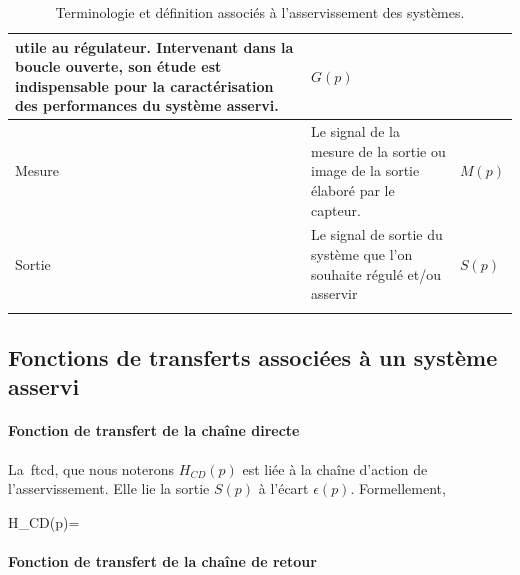 \begin{table}[!h]
\begin{center}
\begin{tabular}{M{3cm}M{8cm}M{4cm}}
                           utile au régulateur. Intervenant dans la boucle ouverte, son étude 
                           est indispensable pour la caractérisation des performances du système asservi.
                                      & $G(p)$                                   \\[0em]
        \hline
        Mesure          & Le signal de la mesure de la sortie ou image de la sortie
                          élaboré par le capteur.
                                      & $M(p)$                                   \\[0em]  
        \hline
        Sortie          & Le signal de sortie du système que l'on souhaite régulé et/ou asservir
                                      & $S(p)$                                   \\[0em]
        \hhline{===}
    \end{tabular}
\end{center}
\caption{Terminologie et définition associés à l'asservissement des systèmes.\label{tab-asser}}
\end{table}

\clearpage

\subsection{Fonctions de transferts associées à un système asservi}


\paragraph{Fonction de transfert de la chaîne directe}

La~\gls{ftcd}, que nous noterons $H_{CD}(p)$ est liée à 
la chaîne d'action de l'asservissement. Elle lie la sortie $S(p)$ à l'écart $\epsilon(p)$.
Formellement,
\begin{bequation}
H_{CD}(p)=
\end{bequation}

\paragraph{Fonction de transfert de la chaîne de retour}

